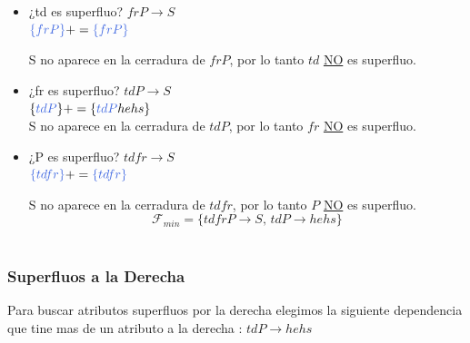 \documentclass[10pt]{article}
\begin{document}
   \begin{itemize}
   	\item ¿td es superfluo? $frP \rightarrow S$\\
   	$\textcolor{RoyalBlue}{\{frP\}}+= \textcolor{RoyalBlue}{\{frP\}} $
   	
   	
   	S no aparece en la cerradura de $frP$, por lo tanto $td$ \underline{NO} es superfluo.\\
   	
   	\item ¿fr es superfluo? $tdP \rightarrow S$\\
   	$\{\textcolor{RoyalBlue}{tdP}\}+= \{\textcolor{RoyalBlue}{tdP}hehs\}$\\
   	
   	S no aparece en la cerradura de $tdP$, por lo tanto $fr$ \underline{NO} es superfluo.\\
   	
   	\item ¿P es superfluo? $tdfr \rightarrow S$\\
   	$\textcolor{RoyalBlue}{\{tdfr\}}+= \textcolor{RoyalBlue}{\{tdfr\}} $
   	
   	S no aparece en la cerradura de $tdfr$, por lo tanto $P$ \underline{NO} es superfluo.\\
   	
   	
   	$$\mathcal{F}_{min}=\{ tdfrP \rightarrow S,\, tdP \rightarrow hehs\}$$\\
   	
   \end{itemize}

   	\subsubsection{Superfluos a la Derecha}
   	
   	Para buscar atributos superfluos por la derecha elegimos la siguiente dependencia que tine mas de un atributo a la derecha : $tdP \rightarrow hehs$
   	
\end{document}
